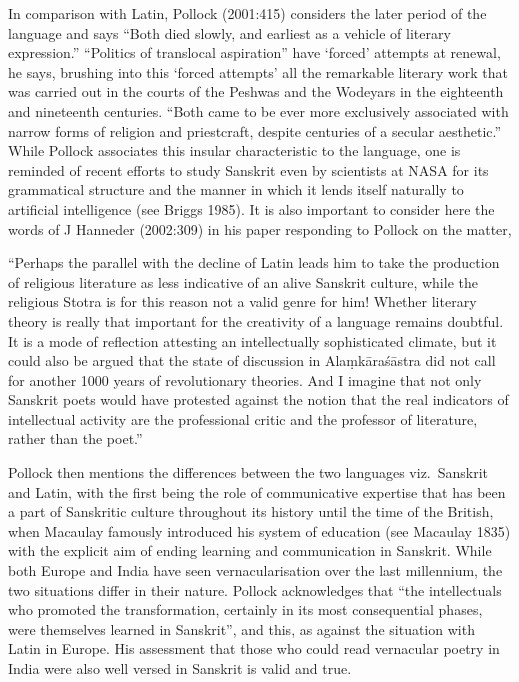 In comparison with Latin, Pollock (2001:415) considers the later period of the language and says “Both died slowly, and earliest as a vehicle of literary expression.” “Politics of translocal aspiration” have ‘forced’ attempts at renewal, he says, brushing into this ‘forced attempts’ all the remarkable literary work that was carried out in the courts of the Peshwas and the Wodeyars in the eighteenth and nineteenth centuries. “Both came to be ever more exclusively associated with narrow forms of religion and priestcraft, despite centuries of a secular aesthetic.” While Pollock associates this insular characteristic to the language, one is reminded of recent efforts to study Sanskrit even by scientists at NASA for its grammatical structure and the manner in which it lends itself naturally to artificial intelligence (see Briggs 1985). It is also important to consider here the words of J Hanneder (2002:309) in his paper responding to Pollock on the matter, 

\begin{myquote}
“Perhaps the parallel with the decline of Latin leads him to take the production of religious literature as less indicative of an alive Sanskrit culture, while the religious Stotra is for this reason not a valid genre for him! Whether literary theory is really that important for the creativity of a language remains doubtful. It is a mode of reflection attesting an intellectually sophisticated climate, but it could also be argued that the state of discussion in Alaṃkāraśāstra did not call for another 1000 years of revolutionary theories. And I imagine that not only Sanskrit poets would have protested against the notion that the real indicators of intellectual activity are the professional critic and the professor of literature, rather than the poet.” 
\end{myquote}

Pollock then mentions the differences between the two languages viz.\ Sanskrit and Latin, with the first being the role of communicative expertise that has been a part of Sanskritic culture throughout its history until the time of the British, when Macaulay famously introduced his system of education (see Macaulay 1835) with the explicit aim of ending learning and communication in Sanskrit. While both Europe and India have seen vernacularisation over the last millennium, the two situations differ in their nature. Pollock acknowledges that “the intellectuals who promoted the transformation, certainly in its most consequential phases, were themselves learned in Sanskrit”, and this, as against the situation with Latin in Europe.  His assessment that those who could read vernacular poetry in India were also well versed in Sanskrit is valid and true. 

